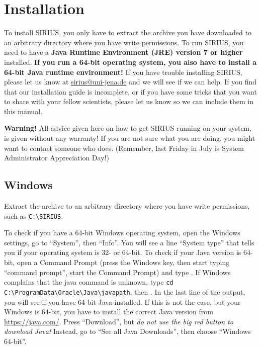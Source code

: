 \documentclass[letterpaper,10pt,openany,oneside]{sphinxmanual}
\begin{document}

\chapter{Installation}
\label{install:installation}\label{install::doc}\label{install:user-interface}

To install SIRIUS, you only have to extract the archive you have downloaded
to an arbitrary directory where you have write permissions.  To run SIRIUS,
you need to have a \textbf{Java Runtime Environment (JRE) version 7 or
higher} installed.  \textbf{If you run a 64-bit operating system, you also
have to install a 64-bit Java runtime environment!}  If you have trouble
installing SIRIUS, please let us know at \url{sirius@uni-jena.de} and we will
see if we can help.  If you find that our installation guide is incomplete,
or if you have some tricks that you want to share with your fellow
scientists, please let us know so we can include them in this manual.

\textbf{Warning!}  All advice given here on how to get SIRIUS running on your
system, is given without any warranty!  If you are not sure what you are
doing, you might want to contact someone who does.  (Remember, last Friday in
July is System Administrator Appreciation Day!)



\section{Windows}
\label{install:windows}

Extract the archive to an arbitrary directory where you have write
permissions, such as \verb|C:\SIRIUS|.

To check if you have a 64-bit Windows operating system, open the Windows
settings, go to ``System'', then ``Info''.  You will see a line ``System
type'' that tells you if your operating system is 32- or 64-bit.  To check if
your Java version is 64-bit, open a Command Prompt (press the Windows key,
then start typing ``command prompt'', start the Command Prompt) and
type .  If Windows complains that the java command is
unknown, type
\verb!cd C:\ProgramData\Oracle\Java\javapath!,
then .  In the last line of the output, you will see if
you have 64-bit Java installed.  If this is not the case, but your Windows is
64-bit, you have to install the correct Java version
from \url{https://java.com/}.  Press ``Download'', but \emph{do not use the
big red button to download Java!}  Instead, go to ``See all Java Downloads'',
then choose ``Windows 64-bit''.
\end{document}
